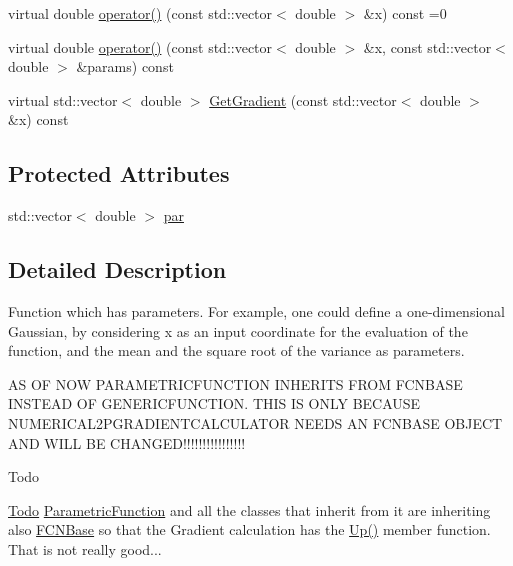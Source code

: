 \begin{DoxyCompactItemize}
\item 
virtual double \mbox{\hyperlink{classROOT_1_1Minuit2_1_1ParametricFunction_a953426fa51c84cdef3eba24274131806}{operator()}} (const std\+::vector$<$ double $>$ \&x) const =0
\item 
virtual double \mbox{\hyperlink{classROOT_1_1Minuit2_1_1ParametricFunction_a5fab6e804e0f93bd593580f582b0f7c5}{operator()}} (const std\+::vector$<$ double $>$ \&x, const std\+::vector$<$ double $>$ \&params) const
\item 
virtual std\+::vector$<$ double $>$ \mbox{\hyperlink{classROOT_1_1Minuit2_1_1ParametricFunction_a209b13474fae14c1e4a5523c6850c7ed}{Get\+Gradient}} (const std\+::vector$<$ double $>$ \&x) const
\end{DoxyCompactItemize}
\subsection*{Protected Attributes}
\begin{DoxyCompactItemize}
\item 
std\+::vector$<$ double $>$ \mbox{\hyperlink{classROOT_1_1Minuit2_1_1ParametricFunction_aae3e17582748a80c3ff5eef35b8ca9ca}{par}}
\end{DoxyCompactItemize}


\subsection{Detailed Description}
Function which has parameters. For example, one could define a one-\/dimensional Gaussian, by considering x as an input coordinate for the evaluation of the function, and the mean and the square root of the variance as parameters. 

AS OF N\+OW P\+A\+R\+A\+M\+E\+T\+R\+I\+C\+F\+U\+N\+C\+T\+I\+ON I\+N\+H\+E\+R\+I\+TS F\+R\+OM F\+C\+N\+B\+A\+SE I\+N\+S\+T\+E\+AD OF G\+E\+N\+E\+R\+I\+C\+F\+U\+N\+C\+T\+I\+ON. T\+H\+IS IS O\+N\+LY B\+E\+C\+A\+U\+SE N\+U\+M\+E\+R\+I\+C\+A\+L2\+P\+G\+R\+A\+D\+I\+E\+N\+T\+C\+A\+L\+C\+U\+L\+A\+T\+OR N\+E\+E\+DS AN F\+C\+N\+B\+A\+SE O\+B\+J\+E\+CT A\+ND W\+I\+LL BE C\+H\+A\+N\+G\+E\+D!!!!!!!!!!!!!!!!

\begin{DoxyRefDesc}{Todo}
\item[\mbox{\hyperlink{todo__todo000012}{Todo}}]\mbox{\hyperlink{classROOT_1_1Minuit2_1_1ParametricFunction}{Parametric\+Function}} and all the classes that inherit from it are inheriting also \mbox{\hyperlink{classROOT_1_1Minuit2_1_1FCNBase}{F\+C\+N\+Base}} so that the Gradient calculation has the \mbox{\hyperlink{classROOT_1_1Minuit2_1_1FCNBase_a04ef08ddad92ce8d89d498efbe021c39}{Up()}} member function. That is not really good...\end{DoxyRefDesc}


